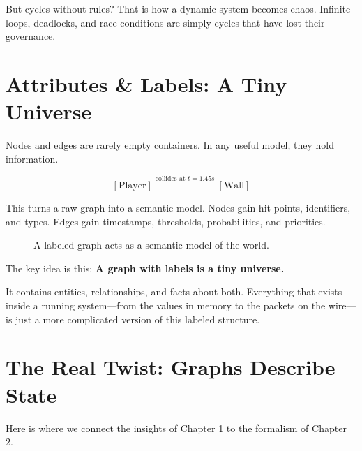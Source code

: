 But cycles without rules? That is how a dynamic system becomes chaos. Infinite loops, deadlocks, and race conditions are simply cycles that have lost their governance.

\section{Attributes \& Labels: A Tiny Universe}
\label{sec:attributes-labels}

Nodes and edges are rarely empty containers. In any useful model, they hold information.

\[ [\text{Player}] \xrightarrow{\text{collides at } t=1.45s} [\text{Wall}] \]

This turns a raw graph into a semantic model. Nodes gain hit points, identifiers, and types. Edges gain timestamps, thresholds, probabilities, and priorities.

\begin{figure}[h]
    \centering
    \caption{A labeled graph acts as a semantic model of the world.}
    \label{fig:labeled_graph}
\end{figure}

The key idea is this: \textbf{A graph with labels is a tiny universe.}

It contains entities, relationships, and facts about both. Everything that exists inside a running system—from the values in memory to the packets on the wire—is just a more complicated version of this labeled structure.

\section{The Real Twist: Graphs Describe State}
\label{sec:graphs-describe-state}

Here is where we connect the insights of Chapter 1 to the formalism of Chapter 2.

